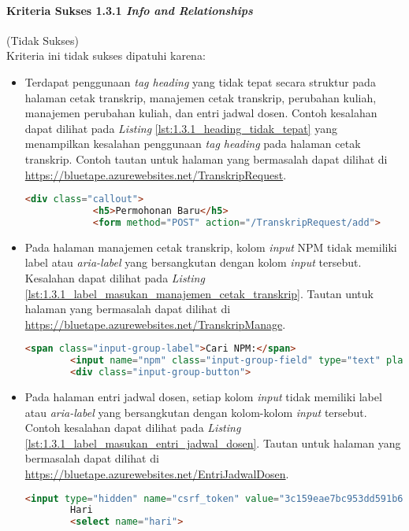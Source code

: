 \paragraph{Kriteria Sukses 1.3.1 \textit{Info and Relationships}}
\label{par:kepatuhan_bluetape_kriteria_sukses_1.3.1}
(Tidak Sukses)\\

Kriteria ini tidak sukses dipatuhi karena:
\begin{itemize}
    \item Terdapat penggunaan \textit{tag heading} yang tidak tepat secara struktur pada halaman cetak transkrip, manajemen cetak transkrip, perubahan kuliah, manajemen perubahan kuliah, dan entri jadwal dosen. Contoh kesalahan dapat dilihat pada \textit{Listing} \ref{lst:1.3.1_heading_tidak_tepat} yang menampilkan kesalahan penggunaan \textit{tag heading} pada halaman cetak transkrip. Contoh tautan untuk halaman yang bermasalah dapat dilihat di \url{https://bluetape.azurewebsites.net/TranskripRequest}.
    \begin{lstlisting}[frame=single, label={lst:1.3.1_heading_tidak_tepat}, language=HTML, caption=Pelanggaran Kriteria Sukses 1.3.1 pada Halaman Cetak Transkrip]
        <div class="callout">
            <h5>Permohonan Baru</h5>
            <form method="POST" action="/TranskripRequest/add">
    \end{lstlisting}

    \item Pada halaman manajemen cetak transkrip, kolom \textit{input} NPM tidak memiliki label atau \textit{aria-label} yang bersangkutan dengan kolom \textit{input} tersebut. Kesalahan dapat dilihat pada \textit{Listing} \ref{lst:1.3.1_label_masukan_manajemen_cetak_transkrip}. Tautan untuk halaman yang bermasalah dapat dilihat di \url{https://bluetape.azurewebsites.net/TranskripManage}.
    \begin{lstlisting}[frame=single, label={lst:1.3.1_label_masukan_manajemen_cetak_transkrip}, language=HTML, caption=Pelanggaran Kriteria Sukses 1.3.1 pada Halaman Manajemen Cetak Transkrip]
        <span class="input-group-label">Cari NPM:</span>
        <input name="npm" class="input-group-field" type="text" placeholder="2013730013" maxlength="10" minlength="10"/>
        <div class="input-group-button">
    \end{lstlisting}

    \item Pada halaman entri jadwal dosen, setiap kolom \textit{input} tidak memiliki label atau \textit{aria-label} yang bersangkutan dengan kolom-kolom \textit{input} tersebut. Contoh kesalahan dapat dilihat pada \textit{Listing} \ref{lst:1.3.1_label_masukan_entri_jadwal_dosen}. Tautan untuk halaman yang bermasalah dapat dilihat di \url{https://bluetape.azurewebsites.net/EntriJadwalDosen}.
    \begin{lstlisting}[frame=single, label={lst:1.3.1_label_masukan_entri_jadwal_dosen}, language=HTML, caption=Pelanggaran Kriteria Sukses 1.3.1 pada Halaman Entri Jadwal Dosen]
        <input type="hidden" name="csrf_token" value="3c159eae7bc953dd591b679c080ed066"/>
        Hari
        <select name="hari">
    \end{lstlisting}
\end{itemize} 

